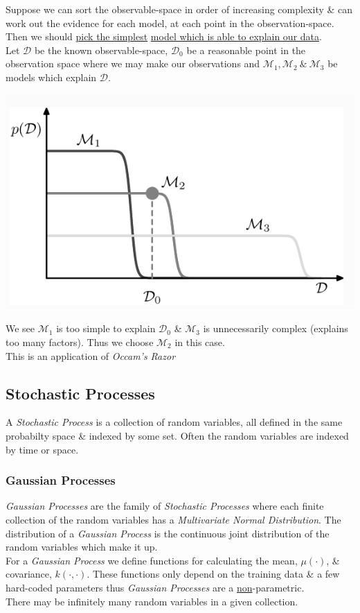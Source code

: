 \documentclass[11pt,a4paper]{article}
\begin{document}
Suppose we can sort the observable-space in order of increasing complexity \& can work out the evidence for each model, at each point in the observation-space. Then we should \underline{pick the simplest} \underline{model which is able to explain our data}.\\
Let $\mathcal{D}$ be the known observable-space, $\mathcal{D}_0$ be a reasonable point in the observation space where we may make our observations and $\mathcal{M}_1,\mathcal{M}_2\ \&\ \mathcal{M}_3$ be models which explain $\mathcal{D}$.
\begin{center}\includegraphics[scale=.5]{img/mackay.png}\end{center}
We see $\mathcal{M}_1$ is too simple to explain $\mathcal{D}_0$ \& $\mathcal{M}_3$ is unnecessarily complex (\ie explains too many factors). Thus we choose $\mathcal{M}_2$ in this case.\\
\nb This is an application of \textit{Occam's Razor}

\subsection{Stochastic Processes}

A \textit{Stochastic Process} is a collection of random variables, all defined in the same probabilty space \& indexed by some set. Often the random variables are indexed by time or space.

\subsubsection{Gaussian Processes}

\textit{Gaussian Processes} are the family of \textit{Stochastic Processes} where each finite collection of the random variables has a \textit{Multivariate Normal Distribution}. The distribution of a \textit{Gaussian Process} is the continuous joint distribution of the random variables which make it up.\\
For a \textit{Gaussian Process} we define functions for calculating the mean, $\mu(\cdot)$, \& covariance, $k(\cdot,\cdot)$. These functions only depend on the training data \& a few hard-coded parameters thus \textit{Gaussian Processes} are a \underline{non}-parametric.\\
\nb There may be infinitely many random variables in a given collection.\\
\end{document}
